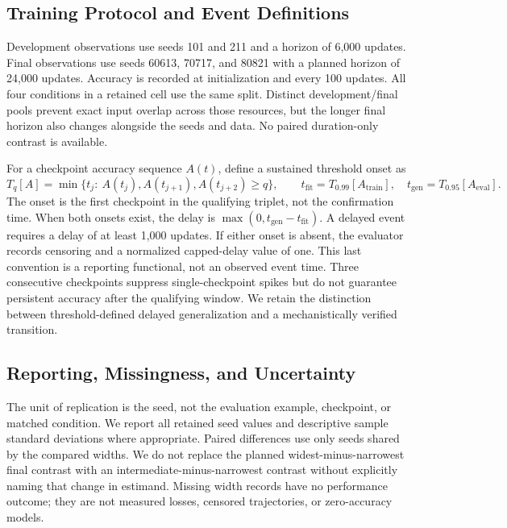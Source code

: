 \documentclass{article}
\newcommand{\fit}{t_{\mathrm{fit}}}
\newcommand{\gen}{t_{\mathrm{gen}}}
\begin{document}
\subsection{Training Protocol and Event Definitions}
Development observations use seeds 101 and 211 and a horizon of 6,000 updates. Final observations use seeds 60613, 70717, and 80821 with a planned horizon of 24,000 updates. Accuracy is recorded at initialization and every 100 updates. All four conditions in a retained cell use the same split. Distinct development/final pools prevent exact input overlap across those resources, but the longer final horizon also changes alongside the seeds and data. No paired duration-only contrast is available.

For a checkpoint accuracy sequence $A(t)$, define a sustained threshold onset as
\begin{equation}
 T_q[A]=\min\{t_j:\ A(t_j),A(t_{j+1}),A(t_{j+2})\geq q\},
 \qquad
 \fit=T_{0.99}[A_{\mathrm{train}}],\quad
 \gen=T_{0.95}[A_{\mathrm{eval}}].
 \label{eq:onset}
\end{equation}
The onset is the first checkpoint in the qualifying triplet, not the confirmation time. When both onsets exist, the delay is $\max(0,\gen-\fit)$. A delayed event requires a delay of at least 1,000 updates. If either onset is absent, the evaluator records censoring and a normalized capped-delay value of one. This last convention is a reporting functional, not an observed event time. Three consecutive checkpoints suppress single-checkpoint spikes but do not guarantee persistent accuracy after the qualifying window. We retain the distinction between threshold-defined delayed generalization and a mechanistically verified transition.

\subsection{Reporting, Missingness, and Uncertainty}
The unit of replication is the seed, not the evaluation example, checkpoint, or matched condition. We report all retained seed values and descriptive sample standard deviations where appropriate. Paired differences use only seeds shared by the compared widths. We do not replace the planned widest-minus-narrowest final contrast with an intermediate-minus-narrowest contrast without explicitly naming that change in estimand. Missing width records have no performance outcome; they are not measured losses, censored trajectories, or zero-accuracy models.
\end{document}
